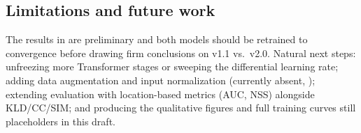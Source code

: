 \subsection{Limitations and future work}
The results in  are preliminary and both models should be retrained to convergence before drawing firm conclusions on v1.1 vs.\ v2.0. Natural next steps: unfreezing more Transformer stages or sweeping the differential learning rate; adding data augmentation and input normalization (currently absent, ); extending evaluation with location-based metrics (AUC, NSS) alongside KLD/CC/SIM; and producing the qualitative figures and full training curves still placeholders in this draft.

